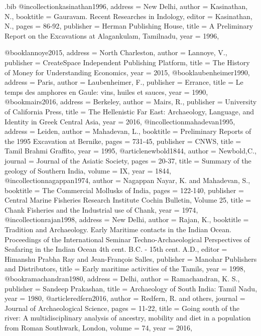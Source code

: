 \begin{filecontents}{\IJSRAidentifier.bib}
@incollection{kasinathan1996,
	address = {New Delhi},
	author = {Kasinathan, N.},
	booktitle = {Gauravam. Recent Researches in Indology},
	editor = {Kasinathan, N.},
	pages = {86-92},
	publisher = {Herman Publishing House},
	title = {A Preliminary Report on the Excavations at Alagankulam, Tamilnadu},
	year = {1996},
}

@book{lannoye2015,
	address = {North Charleston},
	author = {Lannoye, V.},
	publisher = {CreateSpace Independent Publishing Platform},
	title = {The History of Money for Understanding Economics},
	year = {2015},
}
@book{laubenheimer1990,
	address = {Paris},
	author = {Laubenheimer, F.},
	publisher = {Errance},
	title = {Le temps des amphores en Gaule: vins, huiles et sauces},
	year = {1990},
}
@book{mairs2016,
	address = {Berkeley},
	author = {Mairs, R.},
	publisher = {University of California Press},
	title = {The Hellenistic Far East: Archaeology, Language, and Identity in Greek Central Asia},
	year = {2016},
}
@incollection{mahadevan1995,
	address = {Leiden},
	author = {Mahadevan, L.},
	booktitle = {Preliminary Reports of the 1995 Excavation at Bernike},
	pages = {731-45},
	publisher = {CNWS},
	title = {Tamil Brahmi Graffito},
	year = {1995},
}
@article{newbold1844,
	author = {Newbold,C.},
	journal = {Journal of the Asiatic Society},
	pages = {20-37},
	title = {Summary of the geology of Southern India},
	volume = {IX},
	year = {1844},
}
@incollection{nagappan1974,
	author = {Nagappan Nayar, K. and Mahadevan, S.},
	booktitle = {The Commercial Mollusks of India},
	pages = {122-140},
	publisher = {Central Marine Fisheries Research Institute Cochin Bulletin, Volume 25},
	title = {Chank Fisheries and the Industrial use of Chank},
	year = {1974},
}
@incollection{rajan1998,
	address = {New Delhi},
	author = {Rajan, K.},
	booktitle = {Tradition and Archaeology. Early Maritime contacts in the Indian Ocean. Proceedings of the International Seminar Techno-Archaeological Perspectives of Seafaring in the Indian Ocean 4th cent. B.C. - 15th cent. A.D.},
	editor = {Himanshu Prabha Ray and Jean-François Salles},
	publisher = {Manohar Publishers and Distributors},
	title = {Early maritime activities of the Tamils},
	year = {1998},
}
@book{ramachandran1980,
	address = {Delhi},
	author = {Ramachandran, K. S.},
	publisher = {Sandeep Prakashan},
	title = {Archaeology of South India: Tamil Nadu},
	year = {1980},
}
@article{redfern2016,
	author = {Redfern, R. and others},
	journal = {Journal of Archaeological Science},
	pages = {11-22},
	title = {Going south of the river: A multidisciplinary analysis of ancestry, mobility and diet in a population from Roman Southwark, London},
	volume = {74},
	year = {2016},
}


\end{filecontents}
